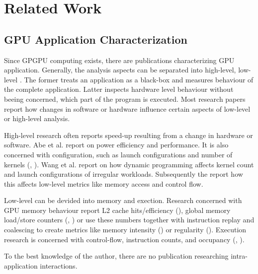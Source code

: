 \chapter{Related Work}
\section{GPU Application Characterization}
Since GPGPU computing exists, there are publications characterizing GPU application. Generally, the analysis
aspects can be separated into high-level, low-level . The former treats an application as a black-box
and measures behaviour of the complete application. Latter inspects hardware level behaviour without
beeing concerned, which part of the program is executed. Most research papers report how changes in software or hardware influence certain aspects of low-level or high-level analysis.

High-level research often reports speed-up resulting from a change in hardware or software. Abe et al. \cite{6877247} report on power efficiency and performance. 
It is also concerned with configuration, such as launch configurations and number of kernels (\cite{6983039}, \cite{Kerr:2009:CAP:1678998.1680778}). Wang et al. \cite{6983039} report on how dynamic programming affects kernel count and launch configurations of irregular workloads. Subsequently the report how this affects low-level metrics like memory access and control flow.

Low-level can be devided into memory and exection.
Research concerned with GPU memory behaviour report L2 cache hits/efficiency (\cite{microarch}), global memory load/store counters (\cite{microarch}, \cite{6983039}) or use these numbers together with instruction replay and coalescing to create metrics like memory intensity (\cite{Kerr:2009:CAP:1678998.1680778}) or regularity (\cite{Burtscher:2012:QSI:2473499.2474126}).  Execution research is concerned with control-flow, instruction counts, and occupancy (\cite{microarch}, \cite{Kerr:2009:CAP:1678998.1680778}).

To the best  knowledge of the author, there are no publication researching intra-application interactions.
